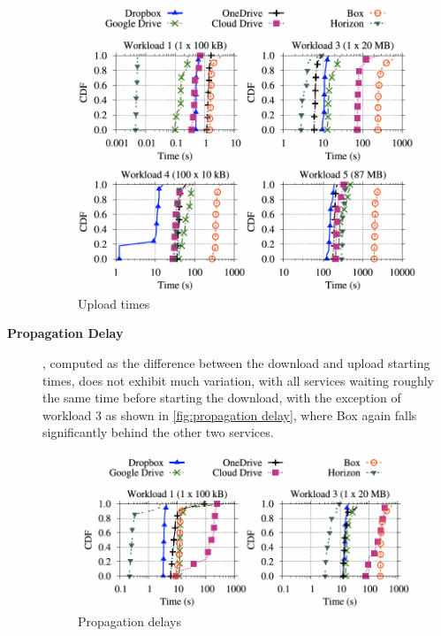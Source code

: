 \begin{description}
    \begin{figure} [h]
        \centering
        \includegraphics[scale=0.7]{images/upload_times}
        \caption{\label{fig:upload}Upload times}
    \end{figure}

    \item[\textbf{Propagation Delay}], computed as the difference between the download and upload starting times,  does not exhibit much variation, with all services waiting roughly the same time before starting the download, with the exception of workload 3 as shown in \autoref{fig:propagation delay}, where Box again falls significantly behind the other two services.

    \begin{figure} [h]
        \centering
        \includegraphics[scale=0.7]{images/propagation_delay}
        \caption{\label{fig:propagation delay}Propagation delays}
    \end{figure}


\end{description}
